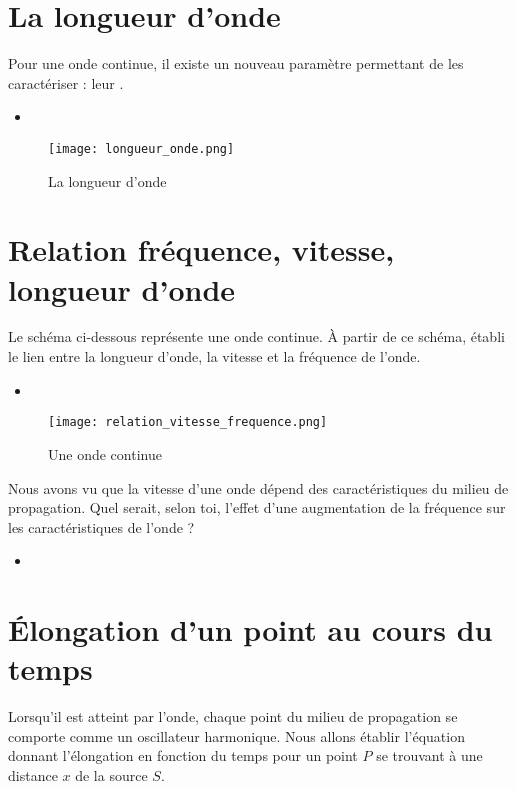 \newpage

\section{La longueur d'onde}
Pour une onde continue, il existe un nouveau paramètre permettant de les caractériser : leur .
\begin{itemize}[label=\textbullet]
    \item {}
\end{itemize}

\begin{figure}[h!]
    \centering
    \texttt{[image: longueur\_onde.png]}
    \caption{La longueur d'onde}
    \label{longueur_onde}
\end{figure}

\newpage

\section{Relation fréquence, vitesse, longueur d'onde}
Le schéma ci-dessous représente une onde continue. À partir de ce schéma, établi le lien entre la longueur d'onde, la vitesse et la fréquence de l'onde.
\begin{itemize}[label=\textbullet]
    \item
\end{itemize}
\begin{figure}[h!]
    \centering
    \texttt{[image: relation\_vitesse\_frequence.png]}
    \caption{Une onde continue}
    \label{relation_vitesse_frequence}
\end{figure}

Nous avons vu que la vitesse d'une onde dépend des caractéristiques du milieu de propagation. Quel serait, selon toi, l'effet d'une augmentation de la fréquence sur les caractéristiques de l'onde ?

\begin{itemize}[label=\textbullet]
    \item
\end{itemize}

\section{Élongation d'un point au cours du temps}
Lorsqu'il est atteint par l'onde, chaque point du milieu de propagation se comporte comme un oscillateur harmonique. Nous allons établir l'équation donnant l'élongation en fonction du temps pour un point \(P\) se trouvant à une distance \(x\) de la source \(S\).

